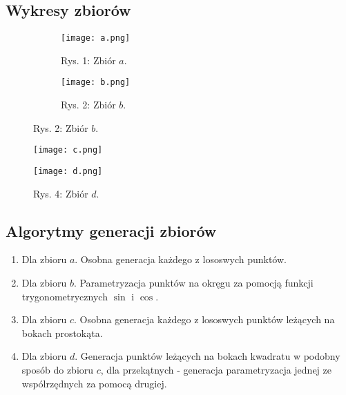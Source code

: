 \subsection{Wykresy zbiorów}
\begin{figure}[!ht]
    \centering
    \begin{subfigure}{.5\textwidth}
      \centering
      \texttt{[image: a.png]}
      \caption*{Rys. 1: Zbiór $a$.}
      \label{fig:sub1}
    \end{subfigure}%
    \begin{subfigure}{.5\textwidth}
      \centering
      \texttt{[image: b.png]}
      \caption*{Rys. 2: Zbiór $b$.}
      \label{fig:sub2}
    \end{subfigure}
    \label{fig:test}
    \end{figure}
    
    \begin{figure}[!ht]
    \centering
    \begin{minipage}{.5\textwidth}
      \centering
      \texttt{[image: c.png]}
      \caption*{Rys. 3: Zbiór $c$.}
      \label{fig:test1}
    \end{minipage}%
    \begin{minipage}{.5\textwidth}
      \centering
      \texttt{[image: d.png]}
      \caption*{Rys. 4: Zbiór $d$.}
      \label{fig:test2}
    \end{minipage}
    \end{figure}
\null
    \subsection{Algorytmy generacji zbiorów}
    \begin{enumerate}
    \item Dla zbioru $a$. Osobna generacja każdego z lososwych punktów.
    \item Dla zbioru $b$. Parametryzacja punktów na okręgu za pomocją funkcji trygonometrycznych $\sin$ i $\cos$.
    \item Dla zbioru $c$. Osobna generacja każdego z lososwych punktów leżących na bokach prostokąta.
    \item Dla zbioru $d$. Generacja punktów leżących na bokach kwadratu w podobny sposób do 
    zbioru $c$, dla przekątnych - generacja parametryzacja jednej ze wspólrzędnych za pomocą drugiej.
    \end{enumerate}